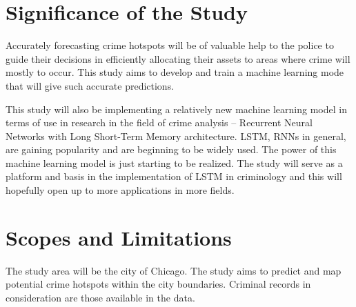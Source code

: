 \section{Significance of the Study} %

    Accurately forecasting crime hotspots will be of valuable help to the police to guide their decisions in efficiently allocating their assets to areas where crime will mostly to occur. This study aims to develop and train a machine learning mode that will give such accurate predictions.

    This study will also be implementing a relatively new machine learning model in terms of use in research in the field of crime analysis – Recurrent Neural Networks with Long Short-Term Memory architecture. LSTM, RNNs in general, are gaining popularity and are beginning to be widely used. The power of this machine learning model is just starting to be realized. The study will serve as a platform and basis in the implementation of LSTM in criminology and this will hopefully open up to more applications in more fields.

\section{Scopes and Limitations} %

    The study area will be the city of Chicago. The study aims to predict and map potential crime hotspots within the city boundaries. Criminal records in consideration are those available in the data.